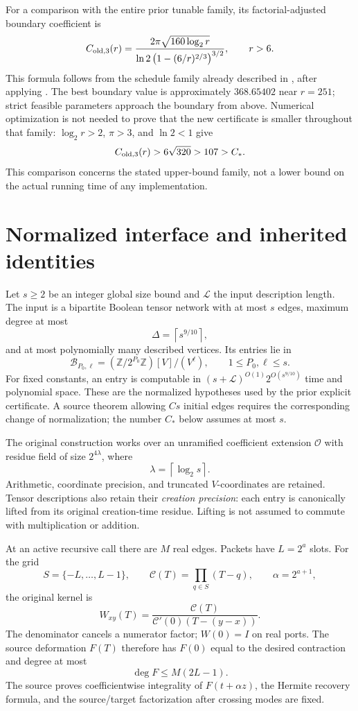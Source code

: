\documentclass[11pt,letterpaper]{article}
\numberwithin{equation}{section}
\theoremstyle{definition}\newtheorem{definition}[theorem]{Definition}
\theoremstyle{remark}\newtheorem{remark}[theorem]{Remark}
\newcommand{\ceil}[1]{\left\lceil #1\right\rceil}
\newcommand{\Ocal}{\mathcal O}
\newcommand{\Cstar}{C_*}
\newcommand{\desc}{\mathcal L}
\begin{document}
For a comparison with the entire prior tunable family, its factorial-adjusted
boundary coefficient is
\[
 C_{\rm old,3}(r)=
 \frac{2\pi\sqrt{160\log_2r}}
 {\ln2\,\bigl(1-(6/r)^{2/3}\bigr)^{3/2}},
 \qquad r>6.
\]
This formula follows from the schedule family already described in
\cite{contractionpacket}, after applying \cite{cauchypacket}.
The best boundary value is approximately $368.65402$ near $r=251$;
strict feasible parameters approach the boundary from above.
Numerical optimization is not needed to prove that the new certificate
is smaller throughout that family: $\log_2r>2$, $\pi>3$, and $\ln2<1$
give
\[
 C_{\rm old,3}(r)>6\sqrt{320}>107>\Cstar.
\]
This comparison concerns the stated upper-bound family, not a lower bound
on the actual running time of any implementation.

\section{Normalized interface and inherited identities}
\label{sec:interface}

Let $s\ge2$ be an integer global size bound and $\desc$ the input description
length. The input is a bipartite Boolean tensor network with at most $s$
edges, maximum degree at most
\[
 \Delta=\ceil{s^{9/10}},
\]
and at most polynomially many described vertices. Its entries lie in
\[
 \mathcal B_{P_0,\ell}=(\mathbb Z/2^{P_0}\mathbb Z)[V]/(V^\ell),
 \qquad 1\le P_0,\ell\le s.
\]
For fixed constants, an entry is computable in
$(s+\desc)^{O(1)}2^{O(s^{9/10})}$ time and polynomial space.
These are the normalized hypotheses used by the prior explicit certificate.
A source theorem allowing $Cs$ initial edges requires the corresponding
change of normalization; the number $\Cstar$ below assumes at most $s$.

The original construction \cite{openai} works over an unramified
coefficient extension $\Ocal$ with residue field of size $2^{4\lambda}$,
where
\[
 \lambda=\ceil{\log_2s}.
\]
Arithmetic, coordinate precision, and truncated $V$-coordinates are retained.
Tensor descriptions also retain their \emph{creation precision}: each entry
is canonically lifted from its original creation-time residue. Lifting is
not assumed to commute with multiplication or addition.

At an active recursive call there are $M$ real edges. Packets have
$L=2^a$ slots. For the grid
\[
 S=\{-L,\ldots,L-1\},\qquad
 \mathcal C(T)=\prod_{q\in S}(T-q),\qquad \alpha=2^{a+1},
\]
the original kernel is
\[
 W_{xy}(T)=\frac{\mathcal C(T)}
                  {\mathcal C'(0)(T-(y-x))}.
\]
The denominator cancels a numerator factor; $W(0)=I$ on real ports.
The source deformation $F(T)$ therefore has $F(0)$ equal to the desired
contraction and degree at most
\begin{equation}
 \deg F\le M(2L-1).\label{eq:degree}
\end{equation}
The source proves coefficientwise integrality of $F(t+\alpha z)$,
the Hermite recovery formula, and the source/target factorization after
crossing modes are fixed.
\end{document}
